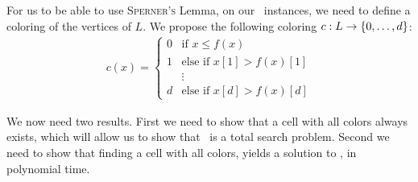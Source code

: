 For us to be able to use \textsc{Sperner's} Lemma, on our \Tarskistar\ instances, we need to define a coloring of the vertices of $L$. We propose the following coloring $c : L \rightarrow \left\{0, \dots, d\right\}$:
\begin{align*}
    c(x) =
    \begin{cases}
        0 & \text{if $x \leq f(x)$}         \\
        1 & \text{else if $x[1] > f(x)[1]$} \\
          & \vdots                          \\
        d & \text{else if $x[d] > f(x)[d]$}
    \end{cases}
\end{align*}

We now need two results. First we need to show that a cell with all colors always exists, which will allow us to show that \Tarskistar\ is a total search problem. Second we need to show that finding a cell with all colors, yields a solution to \Tarskistar, in polynomial time.

